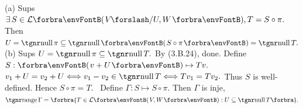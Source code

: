 (a) Sups $\exists\,S\in\Lm{V\XSlash U,W},T=S\circ\pi.$ Then $U=\null\pi\subseteq\null\Par{S\circ\pi}=\null T.$\parSol{}
(b) Sups $U=\null\pi\subseteq\null T.$ By ({3.B.24}), done. \;\Or Define $S:\Par{v+U}\mapsto Tv.$\parSol{\Hb}
$v_1+U=v_2+U\Longleftrightarrow v_1-v_2\in\null T\Longleftrightarrow Tv_1=Tv_2.$ Thus $S$ is well-defined. Hence $S\circ\pi=T.$\parSol{\vspace{2pt}}
\hypertarget{3E20}{}\Corollary \,\,\,Define $\Gamma:S\mapsto S\circ\pi.$ Then  $\Gamma$ is inje, $\range\Gamma=\Bra{T\in\Lm{V,W}:U\subseteq\null T}.$\PfEnd
\SepLine

